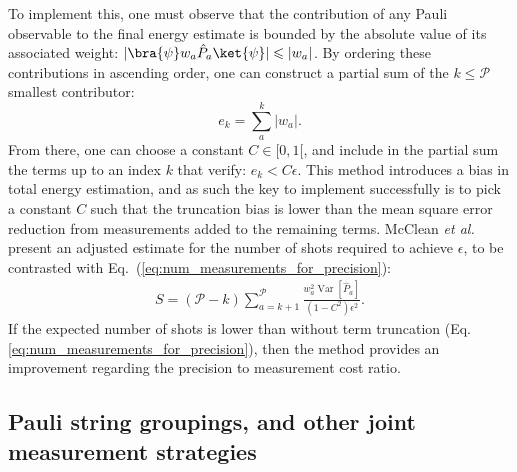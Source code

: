 To implement this, one must observe that the contribution of any Pauli observable to the final energy estimate is bounded by the absolute value of its associated weight: $|\bra{\psi}w_a \hat{P}_a \ket{\psi}| \leqslant |w_a|$.  By ordering these contributions in ascending order, one can construct a partial sum of the $k \leq \mathcal{P}$ smallest contributor: 
\begin{equation}
    e_k = \sum_a^k |w_a|.
\end{equation}
From there, one can choose a constant $C \in [0, 1 [$, and include in the partial sum the terms up to an index $k$ that verify: $e_k < C \epsilon$. This method  \cite{mccleanTheoryVariationalHybrid2015} introduces a bias in total energy estimation, and as such the key to implement successfully is to pick a constant $C$ such that the truncation bias is lower than the mean square error reduction from measurements added to the remaining terms. McClean {\it et al.} \cite{mccleanTheoryVariationalHybrid2015} present an adjusted estimate for the number of shots required to achieve $\epsilon$, to be contrasted with Eq.~(\ref{eq:num_measurements_for_precision}):
\begin{align} \label{eq:num_measurements_for_precision_2}
    S  = (\mathcal{P} - k)\sum_{a=k+1}^{\mathcal{P}} \frac{w_a^2 \operatorname{Var}[\hat{P}_a]}{(1 - C^2)\epsilon^2}.
\end{align}
If the expected number of shots is lower than without term truncation (Eq. \ref{eq:num_measurements_for_precision}), then the method provides an improvement regarding the precision to measurement cost ratio.

\subsection{Pauli string groupings, and other joint measurement strategies} \label{sec:pauli_grouping}

